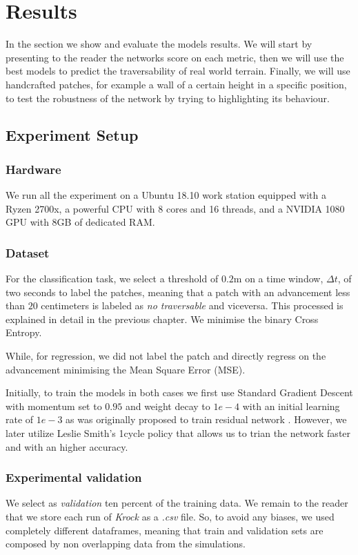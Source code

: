 \documentclass[../document.tex]{subfiles}
\begin{document}
\section{Results}
In the section we show and evaluate the models results. We will start by presenting to the reader the networks score on each metric, then we will use the best models to predict the traversability of real world terrain. Finally, we will use handcrafted patches, for example a wall of a certain height in a specific position, to test the robustness of the network by trying to highlighting its behaviour.
\subsection{Experiment Setup}
\subsubsection{Hardware}
We run all the experiment on a Ubuntu 18.10  work station equipped with a Ryzen 2700x, a powerful CPU with 8 cores and 16 threads, and a NVIDIA 1080 GPU with 8GB of dedicated RAM.
\subsubsection{Dataset}
For the classification task, we select a threshold of $0.2$m on a time window, $\Delta t$, of two seconds to label the patches, meaning that a patch with an advancement less than $20$ centimeters is labeled as \emph{no traversable} and viceversa. This processed is explained in detail in the previous chapter. We minimise the binary Cross Entropy. 

While, for regression, we did not label the patch and directly regress on the advancement  minimising the Mean Square Error (MSE). 

Initially, to train the models in both cases we first use Standard Gradient Descent with momentum set to $0.95$ and weight decay to $1e-4$ with an initial learning rate of $1e-3$ as was originally proposed to train residual network \cite{he2015deep}. However, we later utilize Leslie Smith's 1cycle policy \cite{1cycle} that allows us to trian the network faster and with an higher accuracy.
\subsubsection{Experimental validation}
We select as \emph{validation} ten percent of the training data. We remain to the reader that we store each run of \emph{Krock} as a \emph{.csv} file. So, to avoid any biases, we used completely different dataframes, meaning that train and validation sets are composed by non overlapping data from the simulations.
\end{document}
